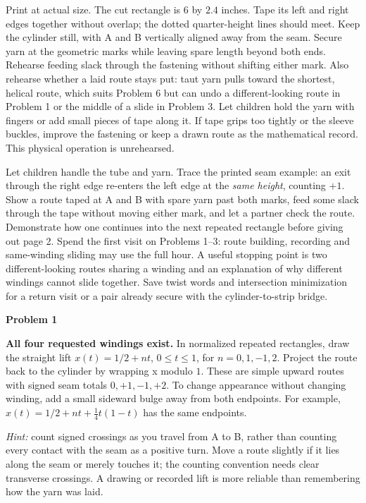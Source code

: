 \documentclass[11pt,letterpaper]{article}
\newcommand{\sect}[1]{\par\vspace{5pt}{\large\bfseries #1}\par}
\newcommand{\prob}[1]{\par\vspace{3pt}\textbf{Problem #1}\par}
\begin{document}
Print at actual size. The cut rectangle is $6$ by $2.4$ inches. Tape its left and
right edges together without overlap; the dotted quarter-height lines should
meet. Keep the cylinder still, with A and B vertically aligned away from the
seam. Secure yarn at the geometric marks while leaving spare length beyond both
ends. Rehearse feeding slack through the fastening without shifting either mark.
Also rehearse whether a laid route stays put: taut yarn pulls toward the shortest,
helical route, which suits Problem 6 but can undo a different-looking route in
Problem 1 or the middle of a slide in Problem 3. Let children hold the yarn with
fingers or add small pieces of tape along it.
If tape grips too tightly or the sleeve buckles, improve the fastening or keep
a drawn route as the mathematical record. This physical operation is unrehearsed.

\sect{Launch and a feasible first visit}
Let children handle the tube and yarn. Trace the printed seam example: an exit
through the right edge re-enters the left edge at the \emph{same height}, counting
$+1$. Show a route taped at A and B with spare yarn past both marks, feed some
slack through the tape without moving either mark, and let a partner check the
route. Demonstrate how
one continues into the next repeated rectangle before giving out page 2.
Spend the first visit on Problems 1--3: route building, recording and same-winding
sliding may use the full hour. A useful stopping point is two different-looking
routes sharing a winding and an explanation of why different windings cannot
slide together. Save twist words and intersection minimization for a return visit
or a pair already secure with the cylinder-to-strip bridge.
\newpage
\sect{Answers and optional hints}
\prob{1}
\textbf{All four requested windings exist.} In normalized repeated rectangles,
draw the straight lift $x(t)=1/2+nt$, $0\le t\le1$, for $n=0,1,-1,2$.
Project the route back to the cylinder by wrapping x modulo $1$. These are simple
upward routes with signed seam totals $0,+1,-1,+2$. To change appearance without
changing winding, add a small sideward bulge away from both endpoints.
For example, $x(t)=1/2+nt+\tfrac14t(1-t)$ has the same endpoints.

\textit{Hint:} count signed crossings as you travel from A to B, rather than
counting every contact with the seam as a positive turn. Move a route slightly
if it lies along the seam or merely touches it; the counting convention needs
clear transverse crossings. A drawing or recorded lift is more reliable than
remembering how the yarn was laid.
\end{document}
